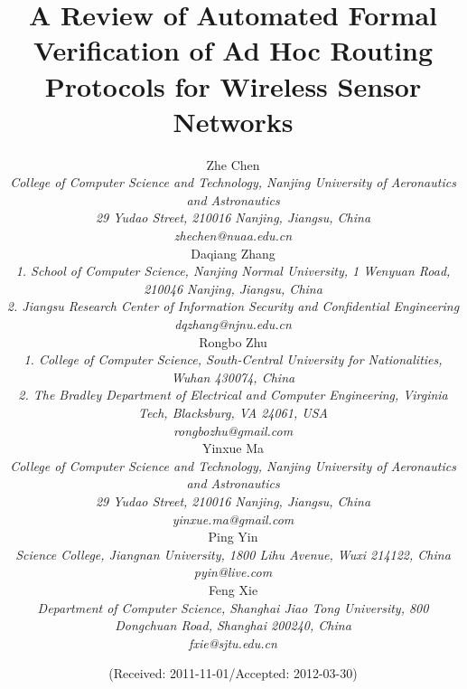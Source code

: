 \documentclass[a4paper,10pt,twocolumn]{article}
\begin{document}
\title{\textbf{A Review of Automated Formal Verification of Ad Hoc Routing Protocols for Wireless Sensor Networks}}
\author{
Zhe Chen\\
\emph{\normalsize College of Computer Science and Technology, Nanjing University of Aeronautics and Astronautics}\\
\emph{\normalsize 29 Yudao Street, 210016 Nanjing, Jiangsu, China}\\
\emph{\normalsize zhechen{@}nuaa.edu.cn}\\
Daqiang Zhang\\
\emph{\normalsize 1. School of Computer Science, Nanjing Normal University, 1 Wenyuan Road, 210046 Nanjing, Jiangsu, China}\\
\emph{\normalsize 2. Jiangsu Research Center of Information Security and Confidential Engineering}\\
\emph{\normalsize dqzhang{@}njnu.edu.cn}\\
Rongbo Zhu\\
\emph{\normalsize 1. College of Computer Science, South-Central University for Nationalities, Wuhan 430074, China}\\
\emph{\normalsize 2. The Bradley Department of Electrical and Computer Engineering, Virginia Tech, Blacksburg, VA 24061, USA}\\
\emph{\normalsize rongbozhu{@}gmail.com}\\
Yinxue Ma\\
\emph{\normalsize College of Computer Science and Technology, Nanjing University of Aeronautics and Astronautics}\\
\emph{\normalsize 29 Yudao Street, 210016 Nanjing, Jiangsu, China}\\
\emph{\normalsize yinxue.ma{@}gmail.com}\\
Ping Yin\\
\emph{\normalsize Science College, Jiangnan University, 1800 Lihu Avenue, Wuxi 214122, China}\\
\emph{\normalsize pyin{@}live.com} \\
Feng Xie\\
\emph{\normalsize Department of Computer Science, Shanghai Jiao Tong University, 800 Dongchuan Road, Shanghai 200240, China}\\
\emph{\normalsize fxie{@}sjtu.edu.cn}
}

\date{\normalsize (Received: 2011-11-01/Accepted: 2012-03-30)}
\end{document}
